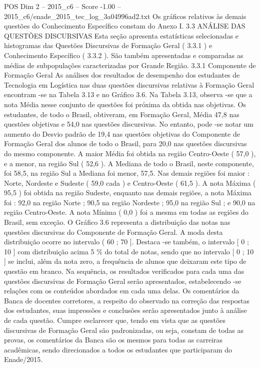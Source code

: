 \begin{textsample}{POS Dim 2 – 2015\_c6 – Score -1.00 – 2015\_c6/enade\_2015\_tec\_log\_3a04996ad2.txt}
Os gráficos relativos às demais questões do Conhecimento Específico constam do Anexo I. 3.3 ANÁLISE DAS QUESTÕES DISCURSIVAS Esta seção apresenta estatísticas selecionadas e histogramas das Questões Discursivas de Formação Geral ( 3.3.1 ) e Conhecimento Específico ( 3.3.2 ).
São também apresentadas e comparadas as médias de subpopulações caracterizadas por Grande Região. 3.3.1 Componente de Formação Geral As análises dos resultados de desempenho dos estudantes de Tecnologia em Logística nas duas questões discursivas relativas à Formação Geral encontram -se na Tabela 3.13 e no Gráfico 3.6.
Na Tabela 3.13, observa -se que a nota Média nesse conjunto de questões foi próxima da obtida nas objetivas.
Os estudantes, de todo o Brasil, obtiveram, em Formação Geral, Média 47,8 nas questões objetivas e 54,0 nas questões discursivas.
No entanto, pode -se notar um aumento do Desvio padrão de 19,4 nas questões objetivas do Componente de Formação Geral dos alunos de todo o Brasil, para 20,0 nas questões discursivas do mesmo componente.
A maior Média foi obtida na região Centro-Oeste ( 57,0 ), e a menor, na região Sul ( 52,6 ).
A Mediana de todo o Brasil, neste componente, foi 58,5, na região Sul a Mediana foi menor, 57,5.
Nas demais regiões foi maior : Norte, Nordeste e Sudeste ( 59,0 cada ) e Centro-Oeste ( 61,5 ).
A nota Máxima ( 95,5 ) foi obtida na região Sudeste, enquanto nas demais regiões, a nota Máxima foi : 92,0 na região Norte ; 90,5 na região Nordeste ; 95,0 na região Sul ; e 90,0 na região Centro-Oeste.
A nota Mínima ( 0,0 ) foi a mesma em todas as regiões do Brasil, sem exceção.
O Gráfico 3.6 representa a distribuição das notas nas questões discursivas do Componente de Formação Geral.
A moda desta distribuição ocorre no intervalo ( 60 ; 70 ].
Destaca -se também, o intervalo [ 0 ; 10 ] com distribuição acima 5 \% do total de notas, sendo que no intervalo [ 0 ; 10 ] se inclui, além da nota zero, a frequência de alunos que deixaram este tipo de questão em branco.
Na sequência, os resultados verificados para cada uma das questões discursivas de Formação Geral serão apresentados, estabelecendo -se relações com os conteúdos abordados em cada uma delas.
Os comentários da Banca de docentes corretores, a respeito do observado na correção das respostas dos estudantes, suas impressões e conclusões serão apresentados junto à análise de cada questão.
Cumpre esclarecer que, tendo em vista que as questões discursivas de Formação Geral são padronizadas, ou seja, constam de todas as provas, os comentários da Banca são os mesmos para todas as carreiras acadêmicas, sendo direcionados a todos os estudantes que participaram do Enade/2015.

\end{textsample}
